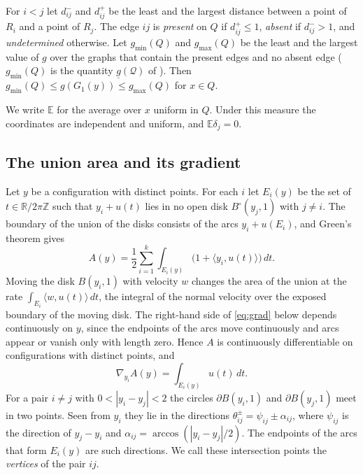 \documentclass[11pt]{amsart}
\theoremstyle{definition}
\theoremstyle{remark}
\numberwithin{equation}{section}
\newcommand{\R}{\mathbb{R}}
\newcommand{\E}{\mathbb{E}}
\newcommand{\gmin}{g_{\min}}
\newcommand{\gmax}{g_{\max}}
\begin{document}
For $i<j$ let $d^-_{ij}$ and $d^+_{ij}$ be the least and the largest distance between a point of $R_i$ and a point of $R_j$. The edge $ij$ is \emph{present} on $Q$ if $d^+_{ij}\le1$, \emph{absent} if $d^-_{ij}>1$, and \emph{undetermined} otherwise. Let $\gmin(Q)$ and $\gmax(Q)$ be the least and the largest value of $g$ over the graphs that contain the present edges and no absent edge ($\gmin(Q)$ is the quantity $\underline g(\mathcal Q)$ of \cite[Section~3.3]{DC26}). Then $\gmin(Q)\le g(G_1(y))\le\gmax(Q)$ for $x\in Q$.

We write $\E$ for the average over $x$ uniform in $Q$. Under this measure the coordinates are independent and uniform, and $\E\delta_j=0$.

\subsection{The union area and its gradient}
Let $y$ be a configuration with distinct points. For each $i$ let $E_i(y)$ be the set of $t\in\R/2\pi\mathbb Z$ such that $y_i+u(t)$ lies in no open disk $B^\circ(y_j,1)$ with $j\ne i$. The boundary of the union of the disks consists of the arcs $y_i+u(E_i)$, and Green's theorem gives
\begin{equation}\label{eq:green}
A(y)=\frac12\sum_{i=1}^k\int_{E_i(y)}\bigl(1+\langle y_i,u(t)\rangle\bigr)\,dt.
\end{equation}
Moving the disk $B(y_i,1)$ with velocity $w$ changes the area of the union at the rate $\int_{E_i}\langle w,u(t)\rangle\,dt$, the integral of the normal velocity over the exposed boundary of the moving disk. The right-hand side of \eqref{eq:grad} below depends continuously on $y$, since the endpoints of the arcs move continuously and arcs appear or vanish only with length zero. Hence $A$ is continuously differentiable on configurations with distinct points, and
\begin{equation}\label{eq:grad}
\nabla_{y_i}A(y)=\int_{E_i(y)}u(t)\,dt.
\end{equation}
For a pair $i\ne j$ with $0<|y_i-y_j|<2$ the circles $\partial B(y_i,1)$ and $\partial B(y_j,1)$ meet in two points. Seen from $y_i$ they lie in the directions $\theta_{ij}^\pm=\psi_{ij}\pm\alpha_{ij}$, where $\psi_{ij}$ is the direction of $y_j-y_i$ and $\alpha_{ij}=\arccos(|y_i-y_j|/2)$. The endpoints of the arcs that form $E_i(y)$ are such directions. We call these intersection points the \emph{vertices} of the pair $ij$.
\end{document}

